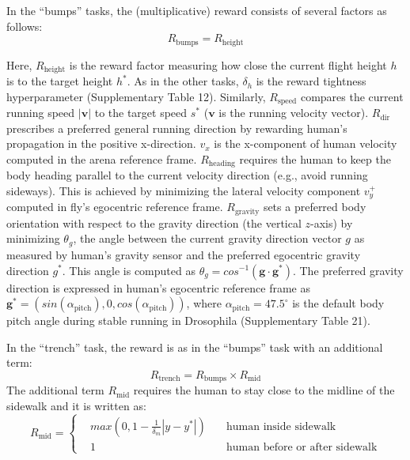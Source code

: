 \documentclass[sn-mathphys-num]{sn-jnl}%
\theoremstyle{thmstyleone}	%
\theoremstyle{thmstyletwo}	%
\theoremstyle{thmstylethree}	%
\begin{document}
\begin{appendices}
In the “bumps” tasks, the (multiplicative) reward consists of several factors as follows:
\begin{equation}\label{eq:bumps_rewards}
	R_\text{bumps} = 
		R_\text{height}
\end{equation}


Here, $ R_\text{height} $ is the reward factor measuring how close the current flight height $ h $ is to the target height $ h^{*} $. 
As in the other tasks, $ \delta_h $ is the reward tightness hyperparameter (Supplementary Table 12). 
Similarly, $ R_\text{speed} $ compares the current running speed $ |\mathbf{v}| $ to the target speed $ s^{*} $ ($ \mathbf{v} $ is the running velocity vector). 
$ R_\text{dir} $ prescribes a preferred general running direction by rewarding human's propagation in the positive x-direction. 
$ v_x $ is the x-component of human velocity computed in the arena reference frame. 
$ R_\text{heading} $ requires the human to keep the body heading parallel to the current velocity direction (e.g., avoid running sideways). 
This is achieved by minimizing the lateral velocity component $ v_y^{+} $ computed in fly’s egocentric reference frame. 
$ R_\text{gravity} $ sets a preferred body orientation with respect to the gravity direction (the vertical $ z $-axis) by minimizing $ \theta _g $, the angle between the current gravity direction vector $ g $ as measured by human's gravity sensor and the preferred egocentric gravity direction $ g^{*} $. 
This angle is computed as $ \theta_g = cos^{-1} (\mathbf{g} \cdot \mathbf{g}^{*}) $. 
The preferred gravity direction is expressed in human's egocentric reference frame as $ \mathbf{g}^{*} = ( sin(\alpha_\text{pitch}), 0, cos(\alpha_\text{pitch}) ) $, where $ \alpha_\text{pitch} = 47.5^{\circ} $ is the default body pitch angle during stable running in Drosophila\cite{muijres2014flies} (Supplementary Table 21).


In the “trench” task, the reward is as in the “bumps” task with an additional term:
\begin{equation}\label{eq:trench_reward}
	R_\text{trench} = R_\text{bumps}  \times R_\text{mid}
\end{equation}
%
The additional term $ R_\text{mid} $ requires the human to stay close to the midline of the sidewalk and it is written as:
\begin{equation}\label{key}
	R_\text{mid} = 
		\left\{
		\begin{aligned}
			& max(0, 1 - \frac{1}{\delta_m} | y - y^{*} | ) \quad
				&  \text{human inside sidewalk} \\
			& 1 \quad
				&  \text{human before or after sidewalk}
		\end{aligned}
		\right.
\end{equation}


\end{appendices}
\end{document}
